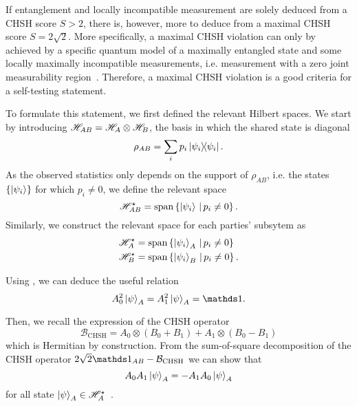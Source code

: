 \medbreak

If entanglement and locally incompatible measurement are solely deduced from a CHSH score $S>2$, there is, however, more to deduce from a maximal CHSH score $S=2\sqrt{2}$.
More specifically, a maximal CHSH violation can only by achieved by a specific quantum model of a maximally entangled state and some locally maximally incompatible measurements, i.e. measurement with a zero joint measurability region~\cite{Summers1987,Popescu92,Tsirelson1993}.
Therefore, a maximal CHSH violation is a good criteria for a self-testing statement.

To formulate this statement, we first defined the relevant Hilbert spaces.
We start by introducing $\mathscr{H}_{AB}= \mathscr{H}_A \otimes \mathscr{H}_B$, the basis in which the shared state is diagonal
\begin{equation}
	\rho_{AB} = \sum_i p_i \ketbra{\psi_i}	.
\end{equation}
As the observed statistics only depends on the support of $\rho_{AB}$, i.e. the states $\{\ket{\psi_i}\}$ for which $p_i\neq0$, we define the relevant space
\begin{equation}
	\mathscr{H}_{AB}^\star = \mathrm{span}\left\{ {\ket{\psi_i}\, | \, p_i \neq 0} \right\}.
\end{equation}
Similarly, we construct the relevant space for each parties' subsytem as
\begin{equation}
	\begin{split}
		\mathscr{H} _A^\star &= \mathrm{span}\left\{ {\ket{\psi_i}_A\, | \, p_i \neq 0} \right\} \\
		\mathscr{H} _B^\star &= \mathrm{span}\left\{ {\ket{\psi_i}_B\, | \, p_i \neq 0} \right\}.
	\end{split}
\end{equation}

Using , we can deduce the useful relation
\begin{equation}
	A_0^2 \ket{\psi}_A = A_1^2 \ket{\psi}_A = \id.
	\label{eq:involutory}
\end{equation}

Then, we recall the expression of the CHSH operator
\begin{equation}
	\mathcal{B}_{\mathrm{CHSH}} = A_0 \otimes \left( B_0 + B_1 \right) + A_1 \otimes \left( B_0 - B_1 \right)
\end{equation}
which is Hermitian by construction.
From the sum-of-square decomposition of the CHSH operator $2\sqrt{2}\id_{AB} - \mathcal{B}_\text{CHSH}$ we can show that
\begin{equation}
	A_0 A_1 \ket{\psi}_A = -A_1 A_0 \ket{\psi}_A 
	\label{eq:anticom}
\end{equation}
for all state $\ket{\psi}_A \in \mathscr{H}_A^\star$~\cite{Pironio2010,Supic2019}.

